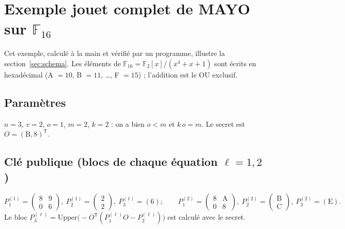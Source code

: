 \chapter{Exemple jouet complet de MAYO sur $\mathbb{F}_{16}$}\label{app:jouet}
Cet exemple, calculé à la main et vérifié par un programme, illustre la section~\ref{sec:schema}. Les éléments de $\mathbb{F}_{16}=\mathbb{F}_2[x]/(x^4+x+1)$ sont écrits en hexadécimal (A $=10$, B $=11$, \dots, F $=15$) ; l'addition est le OU exclusif.

\section*{Paramètres}
$n=3$, $v=2$, $o=1$, $m=2$, $k=2$ : on a bien $o<m$ et $k\,o=m$. Le secret est $O=(\mathrm{B},8)^{\mathsf T}$.

\section*{Clé publique (blocs de chaque équation $\ell=1,2$)}
\[P^{(1)}_1=\begin{pmatrix}8&9\\0&6\end{pmatrix},\ P^{(1)}_2=\begin{pmatrix}2\\2\end{pmatrix},\ P^{(1)}_3=(6);\qquad
P^{(2)}_1=\begin{pmatrix}8&\mathrm{A}\\0&8\end{pmatrix},\ P^{(2)}_2=\begin{pmatrix}\mathrm{B}\\\mathrm{C}\end{pmatrix},\ P^{(2)}_3=(\mathrm{E}).\]
Le bloc $P^{(\ell)}_3=\mathrm{Upper}\bigl(-O^{\mathsf T}(P^{(\ell)}_1O-P^{(\ell)}_2)\bigr)$ est calculé avec le secret.

